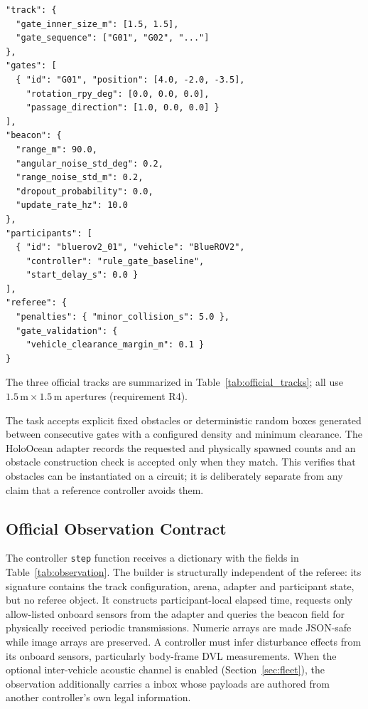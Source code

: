 \begin{lstlisting}[caption={Representative excerpt of a track configuration.}, label={lst:trackjson}]
"track": {
  "gate_inner_size_m": [1.5, 1.5],
  "gate_sequence": ["G01", "G02", "..."]
},
"gates": [
  { "id": "G01", "position": [4.0, -2.0, -3.5],
    "rotation_rpy_deg": [0.0, 0.0, 0.0],
    "passage_direction": [1.0, 0.0, 0.0] }
],
"beacon": {
  "range_m": 90.0,
  "angular_noise_std_deg": 0.2,
  "range_noise_std_m": 0.2,
  "dropout_probability": 0.0,
  "update_rate_hz": 10.0
},
"participants": [
  { "id": "bluerov2_01", "vehicle": "BlueROV2",
    "controller": "rule_gate_baseline",
    "start_delay_s": 0.0 }
],
"referee": {
  "penalties": { "minor_collision_s": 5.0 },
  "gate_validation": {
    "vehicle_clearance_margin_m": 0.1 }
}
\end{lstlisting}

The three official tracks are summarized in Table~\ref{tab:official_tracks}; all use $1.5\,\text{m}\times1.5\,\text{m}$ apertures (requirement R4).



The  task accepts explicit fixed obstacles or deterministic random boxes generated between consecutive gates with a configured density and minimum clearance. The HoloOcean adapter records the requested and physically spawned counts and an obstacle construction check is accepted only when they match. This verifies that obstacles can be instantiated on a circuit; it is deliberately separate from any claim that a reference controller avoids them.

\subsection{Official Observation Contract}
\label{sec:obs_contract}

The controller \texttt{step} function receives a dictionary with the fields in Table~\ref{tab:observation}. The builder is structurally independent of the referee: its signature contains the track configuration, arena, adapter and participant state, but no referee object. It constructs participant-local elapsed time, requests only allow-listed onboard sensors from the adapter and queries the beacon field for physically received periodic transmissions. Numeric arrays are made JSON-safe while image arrays are preserved. A controller must infer disturbance effects from its onboard sensors, particularly body-frame DVL measurements. When the optional inter-vehicle acoustic channel is enabled (Section~\ref{sec:fleet}), the observation additionally carries a  inbox whose payloads are authored from another controller's own legal information.

